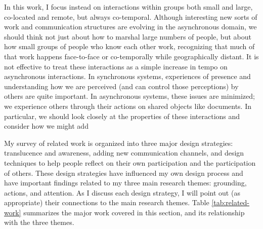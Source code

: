 \documentclass{tufte-handout}
\begin{document}
In this work, I focus instead on interactions within groups both small and large, co-located and remote, but always co-temporal. Although interesting new sorts of work and communication structures are evolving in the asynchronous domain, we should think not just about how to marshal large numbers of people, but about how small groups of people who know each other work, recognizing that much of that work happens face-to-face or co-temporally while geographically distant. It is not effective to treat these interactions as a simple increase in tempo on asynchronous interactions. In synchronous systems, experiences of presence and understanding how we are perceived (and can control those perceptions) by others are quite important. In asynchronous systems, these issues are minimized; we experience others through their actions on shared objects like documents. In particular, we should look closely at the properties of these interactions and consider how we might add 


My survey of related work is organized into three major design strategies: translucence and awareness, adding new communication channels, and design techniques to help people reflect on their own participation and the participation of others. These design strategies have influenced my own design process and have important findings related to my three main research themes: grounding, actions, and attention. As I discuss each design strategy, I will point out (as appropriate) their connections to the main research themes. Table \ref{tab:related-work} summarizes the major work covered in this section, and its relationship with the three themes. 






\end{document}
